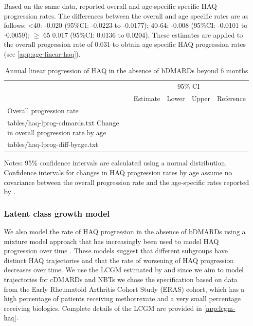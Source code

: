 \documentclass[11pt,final,fleqn]{article}\usepackage[]{graphicx}\usepackage[]{color}
\makeatletter
\theoremstyle{plain}
\newcommand*\ExpandableInput[1]{\@@input#1 }
\makeatother
\begin{document}
Based on the same data, \citet{michaud2011treatment} reported overall and age-specific specific HAQ progression rates. The differences between the overall and age specific rates are as follows: \textless{}40: -0.020 (95\%CI: -0.0223 to -0.0177); 40-64: -0.008 (95\%CI: -0.0101 to -0.0059); \(\geq\) 65 0.017 (95\%CI: 0.0136 to 0.0204). These estimates are applied to the overall progression rate of 0.031 to obtain age specific HAQ progression rates (see \autoref{app:age-linear-haq}).



\begin{table}[!ht]
\begin{center}
\begin{threeparttable}
\caption{Annual linear progression of HAQ in the absence of bDMARDs beyond 6 months} \label{tbl:haq-lprog}
\footnotesize
\begin{tabularx}{\textwidth}{@{\extracolsep{\fill}}lrrrl}
\hline
\multicolumn{2}{l}{} & \multicolumn{2}{c}{95\% CI} & \multicolumn{1}{l}{} \\
\cmidrule{3-4} 
\multicolumn{1}{l}{} & \multicolumn{1}{r}{Estimate} & \multicolumn{1}{r}{Lower} & \multicolumn{1}{r}{Upper} & \multicolumn{1}{l}{Reference} \\
\hline
Overall progression rate \\
\ExpandableInput{tables/haq-lprog-cdmards.txt}
Change in overall progression rate by age \\
\ExpandableInput{tables/haq-lprog-diff-byage.txt}
\hline
\end{tabularx}
\scriptsize
Notes: 95\% confidence intervals are calculated using a normal distribution. Confidence intervals for changes in HAQ progression rates by age assume no covariance between the overall progression rate and the age-specific rates reported by \citet{michaud2011treatment}.
\end{threeparttable}
\end{center}
\end{table}

\subsubsection{Latent class growth model} \label{sec:haq-lcgm}
We also model the rate of HAQ progression in the absence of bDMARDs using a mixture model approach that has increasingly been used to model HAQ progression over time \citep{stevenson2016adalimumab, norton2013trajectories, norton2014health}. These models suggest that different subgroups have distinct HAQ trajectories and that the rate of worsening of HAQ progression decreases over time. We use the LCGM estimated by \citet{norton2014health} and since we aim to model trajectories for cDMARDs and NBTs we chose the specification based on data from the Early Rheumatoid Arthritis Cohort Study (ERAS) cohort, which has a high percentage of patients receiving methotrexate and a very small percentage receiving biologics. Complete details of the LCGM are provided in \autoref{app:lcgm-haq}. 
\end{document}
